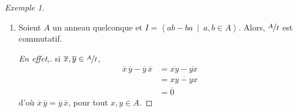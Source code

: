 \documentclass{report}
\theoremstyle{definition}
\theoremstyle{remark}
\newtheorem*{exem}{Exemple}
\begin{document}
\begin{exem}
\begin{enumerate}
			De plus,
			\begin{align*}
				\left(\begin{bmatrix}
					a&0\\0&c
				\end{bmatrix}+I\right)\left(\begin{bmatrix}
					a'&0\\0&c'
				\end{bmatrix}+I\right)&= \left(\begin{bmatrix}
					a&0\\0&c
				\end{bmatrix}\begin{bmatrix}
					a'&0\\0&c'
				\end{bmatrix}\right)+I\\
				&= \begin{bmatrix}
					aa'&0\\0&cc'
				\end{bmatrix}+I\\
				&= \begin{bmatrix}
					a'a&0\\0&c'c
				\end{bmatrix}+I\\
				&= \left(\begin{bmatrix}
					a'&0\\0&c'
				\end{bmatrix}+I\right)\left(\begin{bmatrix}
					a&0\\0&c
				\end{bmatrix}+I\right)
			\end{align*}
			\item Soient $A$ un anneau quelconque et $I=\left\langle ab-ba ~\middle|~ a,b\in A \right\rangle$. Alors, $\sfrac{A}{I}$ est commutatif.
			\begin{proof}[En effet,]
				si $\overline{x},\overline{y}\in \sfrac{A}{I}$,
				\begin{align*}
					\overline{x}\,\overline{y}-\overline{y}\,\overline{x}&= \overline{xy}-\overline{yx}\\
					&= \overline{xy-yx}\\
					&= \overline{0}
				\end{align*}
				d'o\`u $\overline{x}\,\overline{y}=\overline{y}\,\overline{x}$, pour tout $x,y\in A$.
			\end{proof}
		\end{enumerate}
	\end{exem}
\end{document}
